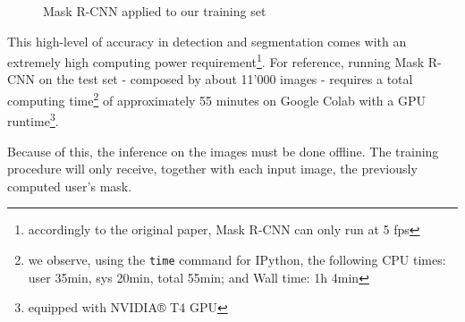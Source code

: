 \begin{figure}[!h]
\begin{center}
\begin{subfigure}[h]{0.32\textwidth}
		\end{subfigure}
	\end{center}
	\vspace{-0.5cm}
	\caption[Mask R-CNN applied to our training set]{Mask R-CNN applied to our training set}
	\label{fig:maskrcnn-dario}
\end{figure}

This high-level of accuracy in detection and segmentation comes with an extremely high computing power requirement\footnote{accordingly to the original paper, Mask R-CNN can only run at 5 \gls{fps}}. For reference, running Mask R-CNN on the test set - composed by about 11'000 images - requires a total computing time\footnote{we observe, using the \texttt{time} command for IPython, the following CPU times: user 35min, sys 20min, total 55min; and Wall time: 1h 4min} of approximately 55 minutes on Google Colab with a GPU runtime\footnote{equipped with NVIDIA® T4 GPU}.

Because of this, the inference on the images must be done offline. The training procedure will only receive, together with each input image, the previously computed user's mask.









